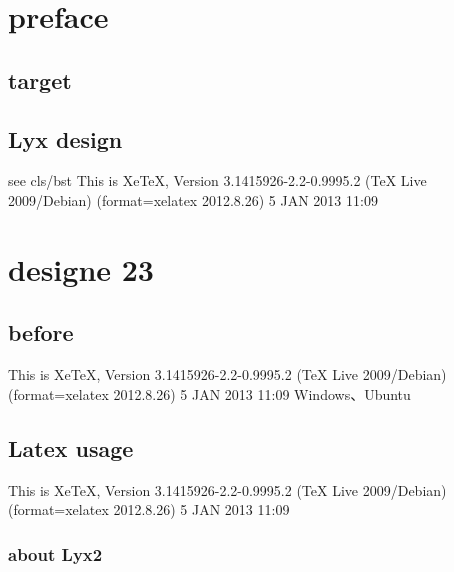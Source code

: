 \documentclass{book}
\begin{document}
 



\frontmatter
 
\tableofcontents{}

\listoftables


\listoffigures

 


\chapter{preface}


\section{target}
 

\section{Lyx design}

see cls/bst This is XeTeX, Version \cite{NPB2}3.1415926-2.2-0\cite{lamport1994latexa}.9995.2 (TeX Live 2009/Debian) (format=xelatex 2012.8.26) 5 JAN 2013 11:09

\chapter{designe 23}


\section{before}

This is XeTeX, Version\cite{Krasnogor2004e} 3.1415926-2.2-0.9995.2\cite{knuth1986thetexbook} (TeX Live 2009/Debian) (format=xelatex 2012.8.26) 5 JAN 2013 11:09 Windows、Ubuntu\cite{Texmaker} 


\section{Latex usage}

This is XeTeX, Version 3.1415926-2.2-0.9995.2 (TeX Live 2009/Debian) (format=xelatex 2012.8.26) 5 JAN 2013 11:09
\cite{chen2007ewi}



\subsection{about Lyx2}
 
 
\end{document}
